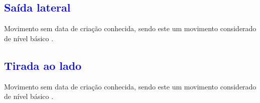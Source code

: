 \subsection{\textcolor{blue}{Saída lateral}}
Movimento sem data de criação conhecida,
sendo este um movimento considerado de nível básico \cite[pp. 144]{perna2002samba}.

\subsection{\textcolor{blue}{Tirada ao lado}}
Movimento sem data de criação conhecida,
sendo este um movimento considerado de nível básico \cite[pp. 144]{perna2002samba}.

